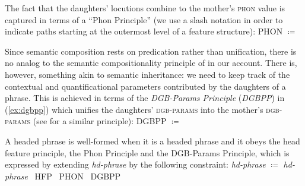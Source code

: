 \documentclass[output=paper,biblatex,babelshorthands,newtxmath,draftmode,colorlinks,citecolor=brown]{langscibook}
\begin{document}
The fact that the daughters' locutions combine to the mother's \textsc{phon} value is captured in terms of a \enquote{Phon Principle}  (we use a slash notation in order to indicate paths starting at the outermost level of a feature structure):
%
\ea 
PHON $\coloneqq$ \label{ex:phon-principle}
\z 

Since  semantic composition rests on predication rather than unification, there is no analog to the semantic compositionality principle of \citet{Sag:Wasow:Bender:2003} in our account.
%
There is, however, something akin to semantic inheritance: we need to keep track of the contextual and quantificational parameters contributed by the daughters of a phrase. 
%
This is achieved in terms of the \emph{DGB-Params Principle} (\emph{DGBPP}) in (\ref{ex:dgbpp}) which unifies the daughters' \textsc{dgb-params} into the mother's \textsc{dgb-params}  (see \citealt[126 \textit{et seq.}]{Ginzburg:2012}  for a similar principle): 
%
\ea \label{ex:dgbpp}
DGBPP $\coloneqq$ \label{ex:QPP} \par\medskip
{}
\z

A headed phrase is well-formed when it is a headed phrase and it obeys the head feature principle, the Phon Principle and the DGB-Params Principle, which is expressed by extending \emph{hd-phrase} by the following constraint:
%
\ea \label{ex:hd-phrase}
\emph{hd-phrase} $\coloneqq$ 
\emph{hd-phrase} \ttrmerge\ {HFP} \ttrmerge\  {PHON} \ttrmerge\ {DGBPP}
\z
\end{document}
